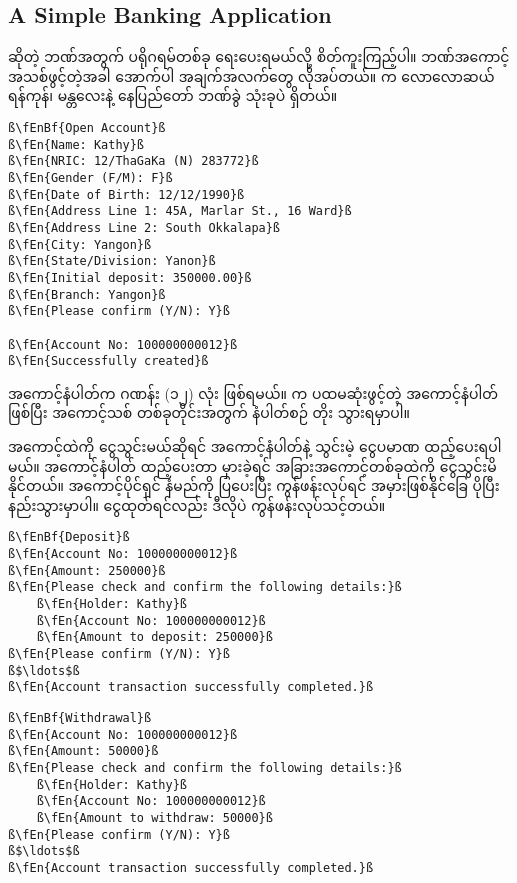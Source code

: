 \subsection*{A Simple Banking Application}
 ဆိုတဲ့ ဘဏ်အတွက် ပရိုဂရမ်တစ်ခု ရေးပေးရမယ်လို့ စိတ်ကူးကြည့်ပါ။ ဘဏ်အကောင့် အသစ်ဖွင့်တဲ့အခါ အောက်ပါ အချက်အလက်တွေ လိုအပ်တယ်။  က လောလောဆယ် ရန်ကုန်၊ မန္တလေးနဲ့ နေပြည်တော် ဘဏ်ခွဲ သုံးခုပဲ ရှိတယ်။ 
%
\begin{verbatim}
ß\fEnBf{Open Account}ß
ß\fEn{Name: Kathy}ß
ß\fEn{NRIC: 12/ThaGaKa (N) 283772}ß
ß\fEn{Gender (F/M): F}ß
ß\fEn{Date of Birth: 12/12/1990}ß
ß\fEn{Address Line 1: 45A, Marlar St., 16 Ward}ß
ß\fEn{Address Line 2: South Okkalapa}ß
ß\fEn{City: Yangon}ß
ß\fEn{State/Division: Yanon}ß
ß\fEn{Initial deposit: 350000.00}ß
ß\fEn{Branch: Yangon}ß
ß\fEn{Please confirm (Y/N): Y}ß

ß\fEn{Account No: 100000000012}ß
ß\fEn{Successfully created}ß
\end{verbatim}
%
အကောင့်နံပါတ်က ဂဏန်း (၁၂) လုံး ဖြစ်ရမယ်။  က ပထမဆုံးဖွင့်တဲ့ အကောင့်နံပါတ်  ဖြစ်ပြီး အကောင့်သစ် တစ်ခုတိုင်းအတွက် နံပါတ်စဉ် တိုး သွားရမှာပါ။

အကောင့်ထဲကို ငွေသွင်းမယ်ဆိုရင် အကောင့်နံပါတ်နဲ့ သွင်းမဲ့ ငွေပမာဏ ထည့်ပေးရပါမယ်။ အကောင့်နံပါတ် ထည့်ပေးတာ မှားခဲ့ရင် အခြားအကောင့်တစ်ခုထဲကို ငွေသွင်းမိနိုင်တယ်။ အကောင့်ပိုင်ရှင် နံမည်ကို ပြပေးပြီး ကွန်ဖန်းလုပ်ရင် အမှားဖြစ်နိုင်ခြေ ပိုပြီးနည်းသွားမှာပါ။ ငွေထုတ်ရင်လည်း ဒီလိုပဲ ကွန်ဖန်းလုပ်သင့်တယ်။

%
\begin{verbatim}
ß\fEnBf{Deposit}ß
ß\fEn{Account No: 100000000012}ß
ß\fEn{Amount: 250000}ß
ß\fEn{Please check and confirm the following details:}ß
    ß\fEn{Holder: Kathy}ß
    ß\fEn{Account No: 100000000012}ß
    ß\fEn{Amount to deposit: 250000}ß
ß\fEn{Please confirm (Y/N): Y}ß 
ß$\ldots$ß
ß\fEn{Account transaction successfully completed.}ß
\end{verbatim}
%

%
\begin{verbatim}
ß\fEnBf{Withdrawal}ß
ß\fEn{Account No: 100000000012}ß
ß\fEn{Amount: 50000}ß
ß\fEn{Please check and confirm the following details:}ß
    ß\fEn{Holder: Kathy}ß
    ß\fEn{Account No: 100000000012}ß
    ß\fEn{Amount to withdraw: 50000}ß
ß\fEn{Please confirm (Y/N): Y}ß 
ß$\ldots$ß
ß\fEn{Account transaction successfully completed.}ß
\end{verbatim}
%

